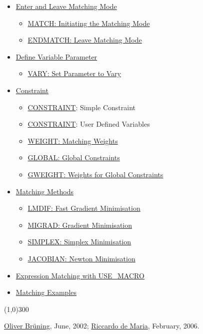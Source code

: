 \begin{itemize}
	\item \href{match_main.html}{Enter and Leave Matching Mode}
\begin{itemize}
	\item \href{match_main.html#match}{MATCH: Initiating the Matching Mode}
	\item \href{match_main.html#endmatch}{ENDMATCH: Leave Matching Mode}
\end{itemize}
	\item \href{match_vary.html}{Define Variable Parameter}
\begin{itemize}
	\item \href{match_vary.html#vary}{VARY: Set Parameter to Vary}
\end{itemize}
	\item \href{match_con.html}{Constraint}
\begin{itemize}
	\item \href{match_con.html#constraint}{CONSTRAINT}: Simple Constraint 
	\item \href{match_con.html#user-var}{CONSTRAINT}: User Defined Variables 
	\item \href{match_con.html#weight}{WEIGHT: Matching Weights}
	\item \href{match_con.html#global}{GLOBAL: Global Constraints}
	\item \href{match_con.html#global}{GWEIGHT: Weights for Global Constraints}
\end{itemize}
	\item \href{match_xeq.html}{Matching Methods}
\begin{itemize}
	\item \href{match_xeq.html#lmdif}{LMDIF: Fast Gradient Minimisation}
	\item \href{match_xeq.html#migrad}{MIGRAD: Gradient Minimisation}
	\item \href{match_xeq.html#simplex}{SIMPLEX: Simplex Minimisation}
	\item \href{match_xeq.html#jacobian}{JACOBIAN: Newton Minimisation}
\end{itemize}
	\item \href{match_um.html}{Expression Matching with USE\_MACRO}
\item \href{match_xmpl.html}{Matching Examples}
\end{itemize}

\line(1,0){300}

\href{http://bruening.home.cern.ch/bruening/}{Oliver Br\"uning}, June, 2002; \href{http://rdemaria.home.cern.ch/rdemaria/}{Riccardo de Maria}, February, 2006. 









